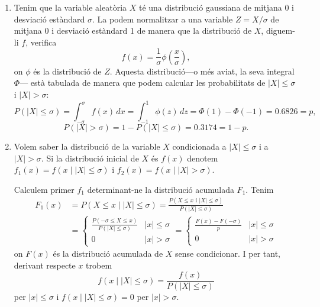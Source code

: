 \documentclass[12pt]{article}
\numberwithin{table}{section}
\numberwithin{figure}{section}
\numberwithin{equation}{section}
\newcommand{\abs}[1]{\left\lvert #1 \right\rvert}
\begin{document}
\begin{enumerate}[label=(\alph*), font=\bfseries \sffamily, wide, labelwidth=!, labelindent=0pt]
	\item Tenim que la variable aleatòria \( X \) té una distribució gaussiana de mitjana 0 i desviació estàndard \( \sigma \). La podem normalitzar a una variable \( Z = X/\sigma \) de mitjana 0 i desviació estàndard 1 de manera que la distribució de \( X \), diguem-li \( f \), verifica
		\begin{equation*}
			f(x) = \frac{1}{\sigma} \phi\left(\frac{x}{\sigma}\right),
		\end{equation*}
		on \( \phi \) és la distribució de \( Z \). Aquesta distribució---o més aviat, la seva integral \( \Phi \)--- està tabulada de manera que podem calcular les probabilitats de \( \abs{X} \leq \sigma \) i \( \abs{X} > \sigma \):
		\begin{equation*}
			P(\abs{X} \leq \sigma) = \int_{-\sigma}^{\sigma} f(x)\,dx = \int_{-1}^{1}\phi(z)\,dz = \Phi(1) - \Phi(-1) = 0.6826 = p,
		\end{equation*}
		\begin{equation*}
			P(\abs{X} > \sigma) = 1 - P(\abs{X} \leq \sigma) = 0.3174 = 1 - p.
		\end{equation*}

	\item Volem saber la distribució de la variable \( X \) condicionada a \( \abs{X} \leq \sigma \) i a \( \abs{X} > \sigma \). Si la distribució inicial de \( X \) és \( f(x) \) denotem \( f_1(x) = f(x \mid \abs{X} \leq \sigma) \) i \( f_2(x) = f(x \mid \abs{X} > \sigma) \).

		Calculem primer \( f_1 \) determinant-ne la distribució acumulada \( F_1 \). Tenim
		\begin{align*}
			F_1(x) &= P(X \leq x \mid \abs{X} \leq \sigma) = \frac{P(X \leq x \text{ i } \abs{X} \leq \sigma)}{P(\abs{X} \leq \sigma)} \\
						 &= \left\{\begin{array}{lr}
			\frac{P(-\sigma \leq X \leq x)}{P(\abs{X} \leq \sigma)} & \abs{x} \leq \sigma \\ 
			0 & \abs{x} > \sigma  
	\end{array} \right. 
	= \left\{\begin{array}{lr}
			\frac{F(x) - F(-\sigma)}{p} & \abs{x} \leq \sigma \\ 
			0 & \abs{x} > \sigma  
	\end{array} \right.
\end{align*}
on \( F(x) \) és la distribució acumulada de \( X \) sense condicionar. I per tant, derivant respecte \( x \) trobem
\begin{equation*}
	f(x \mid \abs{X} \leq \sigma) = \frac{f(x)}{P(\abs{X} \leq \sigma)}	
\end{equation*}
per \( \abs{x} \leq \sigma \)	i \( f(x \mid \abs{X} \leq \sigma) = 0 \) per \( \abs{x} > \sigma \). 	


\end{enumerate}
\end{document}
